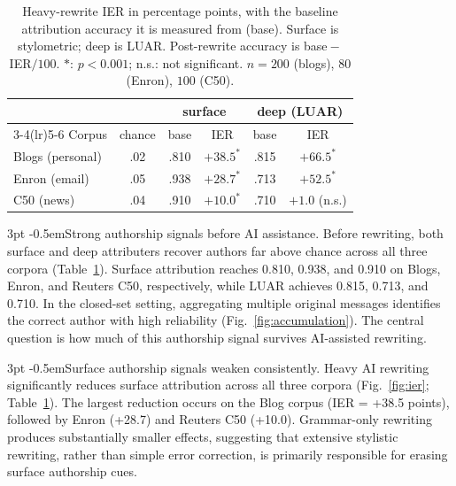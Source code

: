 \documentclass[sigconf,nonacm]{acmart}
\makeatletter
\renewcommand\paragraph{\@startsection{paragraph}{4}{\z@}%
  {3pt \@plus 1pt \@minus 1pt}{-0.5em}{\normalfont\normalsize\bfseries}}
\makeatother
\begin{document}
\begin{table}[t]
\centering
\caption{Heavy-rewrite IER in percentage points, with the baseline attribution
accuracy it is measured from (base). Surface is stylometric; deep is LUAR.
Post-rewrite accuracy is base${}-{}$IER${}/100$. $\ast$: $p<0.001$; n.s.: not
significant. $n=200$ (blogs), $80$ (Enron), $100$ (C50).}
\label{tab:results}
\setlength{\tabcolsep}{4pt}
\begin{tabular}{lccccc}
\toprule
 & & \multicolumn{2}{c}{surface} & \multicolumn{2}{c}{deep (LUAR)} \\
\cmidrule(lr){3-4}\cmidrule(lr){5-6}
Corpus & chance & base & IER & base & IER \\
\midrule
Blogs (personal) & .02 & .810 & $+38.5^{\ast}$ & .815 & $+66.5^{\ast}$ \\
Enron (email)    & .05 & .938 & $+28.7^{\ast}$ & .713 & $+52.5^{\ast}$ \\
C50 (news)       & .04 & .910 & $+10.0^{\ast}$ & .710 & $+1.0$ (n.s.) \\
\bottomrule
\end{tabular}
\end{table}

\paragraph{Strong authorship signals before AI assistance.}
Before rewriting, both surface and deep attributers recover authors far above
chance across all three corpora (Table~\ref{tab:results}). Surface attribution
reaches 0.810, 0.938, and 0.910 on Blogs, Enron, and Reuters C50, respectively,
while LUAR achieves 0.815, 0.713, and 0.710. In the closed-set setting, aggregating
multiple original messages identifies the correct author with high reliability
(Fig.~\ref{fig:accumulation}). The central question is how much of this authorship
signal survives AI-assisted rewriting.

\paragraph{Surface authorship signals weaken consistently.}
Heavy AI rewriting significantly reduces surface attribution across all three
corpora (Fig.~\ref{fig:ier}; Table~\ref{tab:results}). The largest reduction occurs
on the Blog corpus (IER = +38.5 points), followed by Enron (+28.7) and Reuters C50
(+10.0). Grammar-only rewriting produces substantially smaller effects, suggesting
that extensive stylistic rewriting, rather than simple error correction, is
primarily responsible for erasing surface authorship cues.
\end{document}
